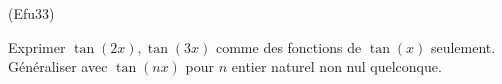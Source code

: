 \begin{tiny}(Efu33)\end{tiny}
Exprimer $\tan(2x), \tan(3x)$ comme des fonctions de $\tan(x)$ seulement. Généraliser avec $\tan(nx)$ pour $n$ entier naturel non nul quelconque.